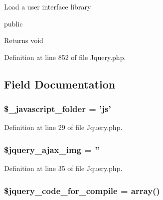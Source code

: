 Load a user interface library

public \begin{DoxyReturn}{Returns}
void 
\end{DoxyReturn}


Definition at line 852 of file Jquery.\-php.



\subsection{Field Documentation}
\hypertarget{class_c_i___jquery_a078b6ad01e6de9b28c6ff3afa31c55db}{
\subsubsection[{\$\-\_\-javascript\-\_\-folder}]{\setlength{\rightskip}{0pt plus 5cm}\$\-\_\-javascript\-\_\-folder = 'js'}}\label{class_c_i___jquery_a078b6ad01e6de9b28c6ff3afa31c55db}


Definition at line 29 of file Jquery.\-php.

\hypertarget{class_c_i___jquery_a41fe5a2b111f2b05a95712824ad1e7f4}{
\subsubsection[{\$jquery\-\_\-ajax\-\_\-img}]{\setlength{\rightskip}{0pt plus 5cm}\$jquery\-\_\-ajax\-\_\-img = ''}}\label{class_c_i___jquery_a41fe5a2b111f2b05a95712824ad1e7f4}


Definition at line 35 of file Jquery.\-php.

\hypertarget{class_c_i___jquery_a807e6910954f1e8e354f7eb16332af3c}{
\subsubsection[{\$jquery\-\_\-code\-\_\-for\-\_\-compile}]{\setlength{\rightskip}{0pt plus 5cm}\$jquery\-\_\-code\-\_\-for\-\_\-compile = array()}}\label{class_c_i___jquery_a807e6910954f1e8e354f7eb16332af3c}


